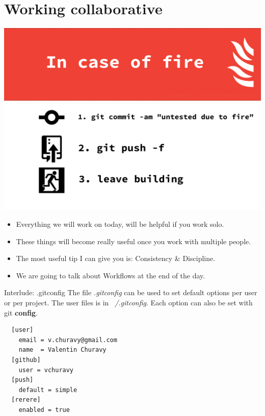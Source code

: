 \documentclass{beamer}
\begin{document}

\section{Working collaborative}
\begin{frame}[fragile]
  \centering
  \includegraphics[width=0.7\linewidth]{Incaseoffire}
  \begin{itemize}
    \item Everything we will work on today, will be helpful if you work solo.
    \item These things will become really useful once you work with multiple people.
    \item The most useful tip I can give you is: \pause Consistency \& Discipline.
    \item We are going to talk about Workflows at the end of the day.
  \end{itemize}
\end{frame}
\begin{frame}[fragile]{Interlude: .gitconfig}
  The file \emph{.gitconfig} can be used to set default options per user or per project. The user files is in \emph{~/.gitconfig}. Each option can also be set with git \textbf{config}.
  \begin{lstlisting}
  [user]
    email = v.churavy@gmail.com
    name  = Valentin Churavy
  [github]
    user = vchuravy
  [push]
    default = simple
  [rerere]
    enabled = true
  \end{lstlisting}
\end{frame}
\end{document}
